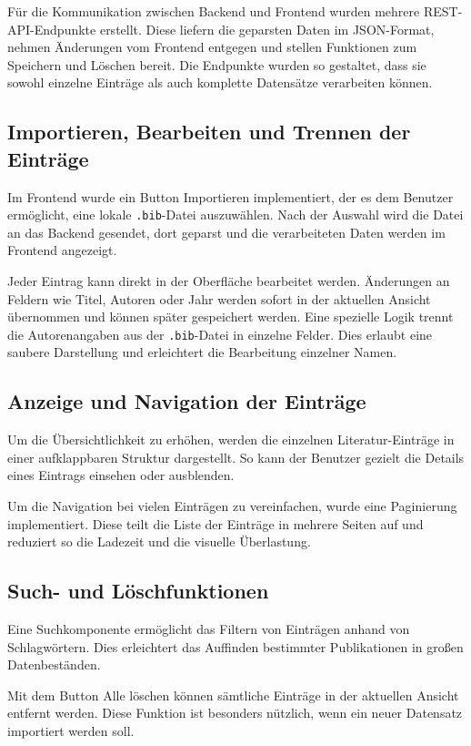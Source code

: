 Für die Kommunikation zwischen Backend und Frontend wurden mehrere REST-API-Endpunkte erstellt.
Diese liefern die geparsten Daten im JSON-Format, nehmen Änderungen vom Frontend entgegen und
stellen Funktionen zum Speichern und Löschen bereit. Die Endpunkte wurden so gestaltet, dass sie sowohl
einzelne Einträge als auch komplette Datensätze verarbeiten können.

\subsection{Importieren, Bearbeiten und Trennen der Einträge}
Im Frontend wurde ein Button \glqq Importieren\grqq{} implementiert, der es dem Benutzer ermöglicht,
eine lokale \texttt{.bib}-Datei auszuwählen. Nach der Auswahl wird die Datei an das Backend gesendet, 
dort geparst und die verarbeiteten Daten werden im Frontend angezeigt.

Jeder Eintrag kann direkt in der Oberfläche bearbeitet werden. Änderungen an Feldern wie Titel,
Autoren oder Jahr werden sofort in der aktuellen Ansicht übernommen und können später gespeichert werden.
Eine spezielle Logik trennt die Autorenangaben aus der \texttt{.bib}-Datei in einzelne Felder.
Dies erlaubt eine saubere Darstellung und erleichtert die Bearbeitung einzelner Namen.

\subsection{Anzeige und Navigation der Einträge}
Um die Übersichtlichkeit zu erhöhen, werden die einzelnen Literatur-Einträge in einer aufklappbaren
Struktur dargestellt. So kann der Benutzer gezielt die Details eines Eintrags einsehen oder ausblenden.

Um die Navigation bei vielen Einträgen zu vereinfachen, wurde eine Paginierung implementiert.
Diese teilt die Liste der Einträge in mehrere Seiten auf und reduziert so die Ladezeit und die visuelle Überlastung.

\subsection{Such- und Löschfunktionen}
Eine Suchkomponente ermöglicht das Filtern von Einträgen anhand von Schlagwörtern.
Dies erleichtert das Auffinden bestimmter Publikationen in großen Datenbeständen.

Mit dem Button \glqq Alle löschen\grqq{} können sämtliche Einträge in der aktuellen Ansicht entfernt werden.
Diese Funktion ist besonders nützlich, wenn ein neuer Datensatz importiert werden soll.

